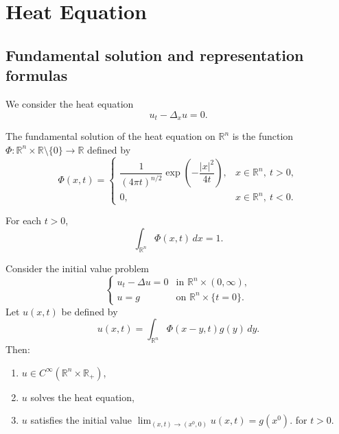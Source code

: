 \chapter{Heat Equation}

\section{Fundamental solution and representation formulas}

We consider the heat equation
$$
u_t-\Delta_x u=0.
$$

\begin{definition}
The fundamental solution of the heat equation on $\mathbb{R}^n$ is the function
$
\Phi:\mathbb{R}^n\times \mathbb{R}\setminus\{0\}\to \mathbb{R}
$
defined by
$$
\Phi(x,t)=
\begin{cases}
\dfrac{1}{(4\pi t)^{n/2}}\exp\!\left(-\dfrac{|x|^2}{4t}\right), & x\in \mathbb{R}^n,\ t>0,\\[1em]
0, & x\in \mathbb{R}^n,\ t<0.
\end{cases}
$$
\end{definition}

\begin{lemma}
For each $t>0$,
$$
\int_{\mathbb{R}^n}\Phi(x,t)\,dx=1.
$$
\end{lemma}

\begin{theorem}
Consider the initial value problem
$$
\begin{cases}
u_t-\Delta u=0 & \text{in } \mathbb{R}^n\times (0,\infty),\\
u=g & \text{on } \mathbb{R}^n\times \{t=0\}.
\end{cases}
$$
Let $u(x,t)$ be defined by
$$
u(x,t)=\int_{\mathbb{R}^n}\Phi(x-y,t)g(y)\,dy.
$$
Then:
\begin{enumerate}
    \item $u\in C^\infty(\mathbb{R}^n\times \mathbb{R}_+)$,
    \item $u$ solves the heat equation,
    \item $u$ satisfies the initial value
    $
    \lim_{(x,t)\to (x^0,0)}u(x,t)=g(x^0).
    $
    for $t >0$.
\end{enumerate}
\end{theorem}



